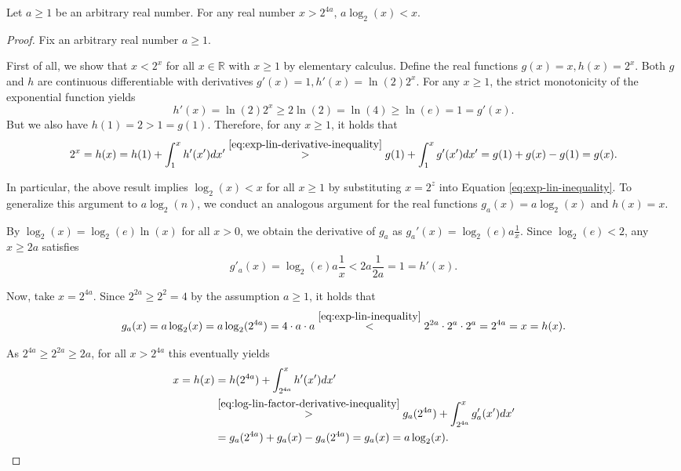 \begin{lemma}
	\label{lemma:log-lin-inequality}
	Let $a\geq 1$ be an arbitrary real number.
	For any real number $x> 2^{4a}$, $a\log_2(x)< x$.
\end{lemma}
\begin{proof}
	Fix an arbitrary real number $a\geq 1$.
	
	First of all, we show that $x<2^x$ for all $x\in\mathbb{R}$ with $x\geq 1$ by elementary calculus.
	Define the real functions $g(x)=x,h(x)=2^x$.
	Both $g$ and $h$ are continuous differentiable with derivatives $g'(x)=1,h'(x)=\ln(2)2^x$.
	For any $x\geq 1$, the strict monotonicity of the exponential function yields
	\begin{equation}
		\label{eq:exp-lin-derivative-inequality}
		h'(x)=\ln(2)2^x\geq 2\ln(2)=\ln(4)\geq \ln(e)=1=g'(x).
	\end{equation}
	But we also have $h(1)=2>1=g(1)$.
	Therefore, for any $x\geq 1$, it holds that
	\begin{equation}
		\label{eq:exp-lin-inequality}
		2^x=h(x)=h(1)+\int_{1}^{x}h'(x')dx'\overset{\ref{eq:exp-lin-derivative-inequality}}{>} g(1)+\int_{1}^{x}g'(x')dx'=g(1)+g(x)-g(1)=g(x).
	\end{equation}
	
	In particular, the above result implies $\log_2(x)< x$ for all $x\geq 1$ by substituting $x=2^z$ into Equation \ref{eq:exp-lin-inequality}.
	To generalize this argument to $a\log_2(n)$, we conduct an analogous argument for the real functions $g_a(x)=a\log_2(x)$ and $h(x)=x$.
	
	By $\log_2(x)=\log_2(e)\ln(x)$ for all $x>0$, we obtain the derivative of $g_a$ as $g_a'(x)=\log_2(e)a\frac{1}{x}$.
	Since $\log_2(e) < 2$, any $x\geq 2a$ satisfies
	\begin{equation}
		\label{eq:log-lin-factor-derivative-inequality}
		g'_a(x)=\log_2(e)a\frac{1}{x}< 2a\frac{1}{2a}=1=h'(x).
	\end{equation}
	
	Now, take $x=2^{4a}$. Since $2^{2a} \geq 2^2 = 4$ by the assumption $a\geq 1$, it holds that
	\begin{equation}
		\label{eq:log-lin-factor-inequality-init}
		g_a(x)=a\log_2(x)=a\log_2(2^{4a})=4\cdot a \cdot a \overset{\ref{eq:exp-lin-inequality}}{<}2^{2a}\cdot 2^a\cdot 2^a=2^{4a}=x=h(x).
	\end{equation}
	
	As $2^{4a}\geq 2^{2a}\geq 2a$, for all $x> 2^{4a}$ this eventually yields
	\begin{align}
		\label{eq:log-lin-inequality}
		x=h(x)&=h(2^{4a})+\int_{2^{4a}}^{x}h'(x')dx'\\
		&\overset{\ref{eq:log-lin-factor-derivative-inequality}}{>} g_a(2^{4a})+\int_{2^{4a}}^{x}g_a'(x')dx'\\
		&=g_a(2^{4a})+g_a(x)-g_a(2^{4a})=g_a(x)=a\log_2(x).
	\end{align}
\end{proof}

